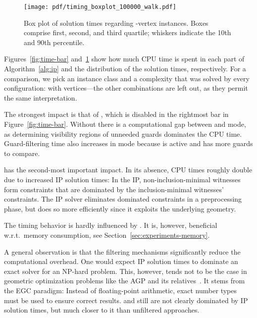 \begin{figure}
	\centering
	\texttt{[image: pdf/timing\_boxplot\_100000\_walk.pdf]}
	\caption{Box plot of solution times regarding -vertex \walk instances.
		Boxes comprise first, second, and third quartile;
		whiskers indicate the 10th and 90th percentile.}
	\label{fig:time-boxplot}
\end{figure}

Figures~\ref{fig:time-bar} and~\ref{fig:time-boxplot} show how much CPU time is spent in each part of Algorithm~\ref{alg:ip} and the distribution of the solution times, respectively.
For a comparison, we pick an instance class and a complexity that was solved by every configuration:
\walk with  vertices\dash---the other combinations are left out, as they permit the same interpretation.

The strongest impact is that of \pointguardfilter, which is disabled in the rightmost bar in Figure~\ref{fig:time-bar}.
Without \pointguardfilter there is a computational gap between \pointguardmode and \vertexguardmode mode, as determining visibility regions of unneeded guards dominates the CPU time.
Guard-filtering time also increases in \pnoedge mode because \domfilter is active and has more guards to compare.

\witnessfilter has the second-most important impact.
In its absence, CPU times roughly double due to increased \ac{IP} solution times:
In the \ac{IP}, non-inclusion-minimal witnesses form constraints that are dominated by the inclusion-minimal witnesses' constraints.
The \ac{IP} solver eliminates dominated constraints in a preprocessing phase, but \witnessfilter does so more efficiently since it exploits the underlying geometry.

The timing behavior is hardly influenced by \domfilter.
It is, however, beneficial w.r.t.\ memory consumption, see Section~\ref{sec:experiments-memory}.

A general observation is that the filtering mechanisms significantly reduce the computational overhead.
One would expect \ac{IP} solution times to dominate an exact solver for an NP-hard problem.
This, however, tends not to be the case in geometric optimization problems like the \ac{AGP} and its relatives~\cite{rsfhkt-eag-14}.
It stems from the \ac{EGC} paradigm:
Instead of floating-point arithmetic, exact number types must be used to ensure correct results.
\vdefault and \pdefault still are not clearly dominated by \ac{IP} solution times, but much closer to it than unfiltered approaches.

